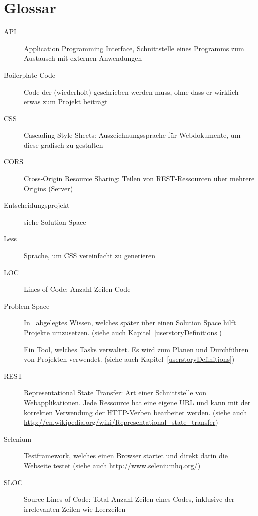 \chapter{Glossar}
	\begin{description}
		\item[API]{Application Programming Interface, Schnittstelle eines Programms zum Austausch mit externen Anwendungen}
		\item[Boilerplate-Code]{Code der (wiederholt) geschrieben werden muss, ohne dass er wirklich etwas zum Projekt beiträgt}
		\item[CSS]{Cascading Style Sheets: Auszeichnungssprache für Webdokumente, um diese grafisch zu gestalten}
		\item[CORS]{Cross-Origin Resource Sharing: Teilen von REST-Ressourcen über mehrere Origins (Server)}
		\item[Entscheidungsprojekt]{siehe Solution Space}
		\item[Less]{Sprache, um CSS vereinfacht zu generieren}
		\item[LOC]{Lines of Code: Anzahl Zeilen Code}
		\item[Problem Space]{In \cdar\ abgelegtes Wissen, welches später über einen Solution Space hilft Projekte umzusetzen. (siehe auch Kapitel~\ref{userstoryDefinitions})}
		\item[\ppt]{Ein Tool, welches Tasks verwaltet. Es wird zum Planen und Durchführen von Projekten verwendet. (siehe auch Kapitel~\ref{userstoryDefinitions})}
		\item[REST]{Representational State Transfer: Art einer Schnittstelle von Webapplikationen. Jede Ressource hat eine eigene URL und kann mit der korrekten Verwendung der HTTP-Verben bearbeitet werden. (siehe auch \url{http://en.wikipedia.org/wiki/Representational_state_transfer})}
		\item[Selenium]{Testframework, welches einen Browser startet und direkt darin die Webseite testet (siehe auch \url{http://www.seleniumhq.org/})}
		\item[SLOC]{Source Lines of Code: Total Anzahl Zeilen eines Codes, inklusive der irrelevanten Zeilen wie Leerzeilen}

\end{description}
